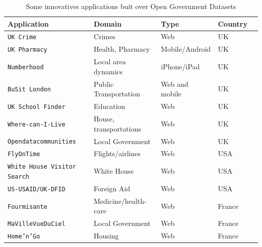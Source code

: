 \begin{table}[ht!b]
    \caption{Some innovatives applications buit over Open Government Datasets} \label{tab:apps-survey}
    \small
    \center
   \begin{tabularx}{\textwidth}{@{}llllX@{}}
    \toprule
    \textbf{Application} & \textbf{Domain} & \textbf{Type} &  \textbf{Country}  \\
    \toprule
    \texttt{UK Crime} &	Crimes & Web & UK  \\
    \midrule
\texttt{UK Pharmacy} & Health, Pharmacy  & Mobile/Android  & UK \\
	\midrule
	\texttt{Numberhood} & Local area dynamics  & iPhone/iPad & UK \\
	
	\midrule
	\texttt{BuSit London} & Public Transportation  & Web and mobile  & UK \\
	
	\midrule
	\texttt{UK School Finder} & Education  & Web  & UK \\
	
	\midrule
	\texttt{Where-can-I-Live} & House, transportations & Web  & UK \\
	\midrule
	
	\texttt{Opendatacommunities} & Local Government & Web  & UK \\
	\midrule
	
	\texttt{FlyOnTime } & Flights/airlines & Web  & USA \\
	\midrule
	
	\texttt{White House Visitor Search} & White House & Web  & USA \\
	\midrule
	
	\texttt{US-USAID/UK-DFID} & Foreign Aid & Web  & USA \\
	\midrule
	
	\texttt{Fourmisante} & Medicine/health-care & Web  & France \\
	\midrule
	
	\texttt{MaVilleVueDuCiel} & Local Government  & Web & France \\
	\midrule
	
	\texttt{Home'n'Go } & Housing & Web & France \\
	
	
    \bottomrule

    \end{tabularx}
    \end{table}

